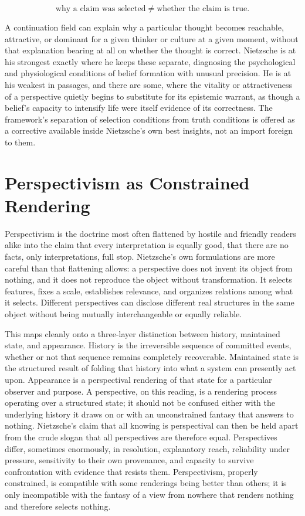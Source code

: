 \documentclass[11pt]{article}
\begin{document}
\[
\text{why a claim was selected} \;\neq\; \text{whether the claim is true.}
\]

A continuation field can explain why a particular thought becomes reachable, attractive, or dominant for a given thinker or culture at a given moment, without that explanation bearing at all on whether the thought is correct. Nietzsche is at his strongest exactly where he keeps these separate, diagnosing the psychological and physiological conditions of belief formation with unusual precision. He is at his weakest in passages, and there are some, where the vitality or attractiveness of a perspective quietly begins to substitute for its epistemic warrant, as though a belief's capacity to intensify life were itself evidence of its correctness. The framework's separation of selection conditions from truth conditions is offered as a corrective available inside Nietzsche's own best insights, not an import foreign to them.

\section*{Perspectivism as Constrained Rendering}

Perspectivism is the doctrine most often flattened by hostile and friendly readers alike into the claim that every interpretation is equally good, that there are no facts, only interpretations, full stop. Nietzsche's own formulations are more careful than that flattening allows: a perspective does not invent its object from nothing, and it does not reproduce the object without transformation. It selects features, fixes a scale, establishes relevance, and organizes relations among what it selects. Different perspectives can disclose different real structures in the same object without being mutually interchangeable or equally reliable.

This maps cleanly onto a three-layer distinction between history, maintained state, and appearance. History is the irreversible sequence of committed events, whether or not that sequence remains completely recoverable. Maintained state is the structured result of folding that history into what a system can presently act upon. Appearance is a perspectival rendering of that state for a particular observer and purpose. A perspective, on this reading, is a rendering process operating over a structured state; it should not be confused either with the underlying history it draws on or with an unconstrained fantasy that answers to nothing. Nietzsche's claim that all knowing is perspectival can then be held apart from the crude slogan that all perspectives are therefore equal. Perspectives differ, sometimes enormously, in resolution, explanatory reach, reliability under pressure, sensitivity to their own provenance, and capacity to survive confrontation with evidence that resists them. Perspectivism, properly constrained, is compatible with some renderings being better than others; it is only incompatible with the fantasy of a view from nowhere that renders nothing and therefore selects nothing.
\end{document}
